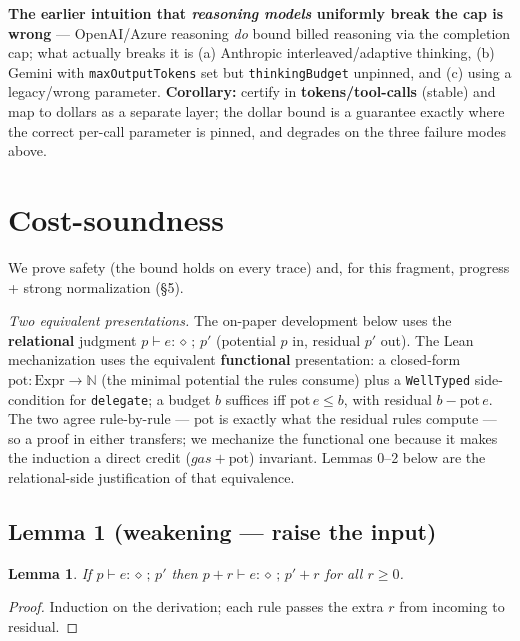 \documentclass[11pt]{article}
\theoremstyle{plain}
\newtheorem*{lemmaU}{Lemma}
\newcommand{\J}[3]{#1 \vdash #2 : \diamond\,;\,#3}    %
\newcommand{\pot}{\mathrm{pot}}
\begin{document}
\textbf{The earlier intuition that \emph{reasoning models} uniformly break the cap is wrong} ---
OpenAI/Azure reasoning \emph{do} bound billed reasoning via the completion cap; what actually
breaks it is (a) Anthropic interleaved/adaptive thinking, (b) Gemini with \texttt{maxOutputTokens}
set but \texttt{thinkingBudget} unpinned, and (c) using a legacy/wrong parameter.
\textbf{Corollary:} certify in \textbf{tokens/tool-calls} (stable) and map to dollars as a separate
layer; the dollar bound is a guarantee exactly where the correct per-call parameter is pinned, and
degrades on the three failure modes above.

\section{Cost-soundness}

We prove safety (the bound holds on every trace) and, for this fragment, progress + strong
normalization (\S5).

\emph{Two equivalent presentations.} The on-paper development below uses the \textbf{relational}
judgment $\J{p}{e}{p'}$ (potential $p$ in, residual $p'$ out). The Lean mechanization uses the
equivalent \textbf{functional} presentation: a closed-form $\pot : \mathrm{Expr} \to \mathbb{N}$
(the minimal potential the rules consume) plus a \texttt{WellTyped} side-condition for
\texttt{delegate}; a budget $b$ suffices iff $\pot\, e \le b$, with residual $b - \pot\, e$. The
two agree rule-by-rule --- $\pot$ is exactly what the residual rules compute --- so a proof in
either transfers; we mechanize the functional one because it makes the induction a direct credit
($\mathit{gas} + \pot$) invariant. Lemmas 0--2 below are the relational-side justification of that
equivalence.

\subsection{Lemma 1 (weakening --- raise the input)}

\begin{lemmaU}
If $\J{p}{e}{p'}$ then $\J{p + r}{e}{p' + r}$ for all $r \ge 0$.
\end{lemmaU}

\begin{proof}
Induction on the derivation; each rule passes the extra $r$ from incoming to residual.
\end{proof}
\end{document}
